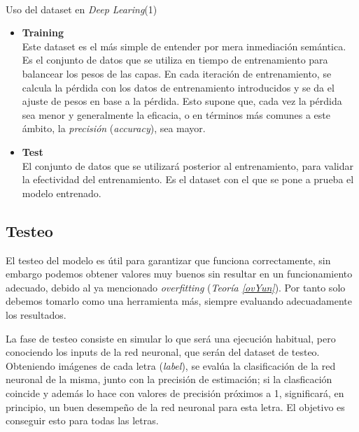 \begin{teoria}{Uso del dataset en \textit{Deep Learing}(1)\textsuperscript{\cite{Andreas}}}
\begin{itemize}
\begin{teoria}{\textit{Overfitting} y \textit{Underfitting}\label{ovYun}}
\begin{itemize}
                \item \textbf{\textit{Underfitting}}\\
                {\small Término análogo y opuesto al anterior, el ajuste se
                presentaría laxo y falto de rigurosidad; ajuste por debajo de
                lo óptimo.} 
            \end{itemize}\end{teoria}
        \item \textbf{Training}\\
        {\small Este dataset es el más simple de entender por mera inmediación
        semántica. Es el conjunto de datos que se utiliza en tiempo de entrenamiento
        para balancear los pesos de las capas. En cada iteración de entrenamiento,
        se calcula la pérdida con los datos de entrenamiento introducidos y
        se da el ajuste de pesos en base a la pérdida. Esto supone que, cada vez la
        pérdida sea menor y generalmente la eficacia, o en términos más comunes a este
        ámbito, la \textit{precisión} (\textit{accuracy}), sea mayor.}
        \item \textbf{Test}\\
        {\small El conjunto de datos que se utilizará posterior al entrenamiento, para
        validar la efectividad del entrenamiento.
        Es el dataset con el que se pone a prueba el modelo entrenado.}
    \end{itemize}
\end{teoria}
\newpage

\subsection{Testeo}
El testeo del modelo es útil para garantizar que funciona correctamente, sin
embargo podemos obtener valores muy buenos sin resultar en un funcionamiento
adecuado, debido al ya mencionado \textit{overfitting} (\textit{Teoría \ref{ovYun}}).
Por tanto solo debemos tomarlo como una herramienta más, siempre evaluando
adecuadamente los resultados.

La fase de testeo consiste en simular lo que será una ejecución habitual,
pero conociendo los inputs de la red neuronal, que serán del dataset
de testeo. Obteniendo imágenes de cada letra (\textit{label}), se evalúa
la clasificación de la red neuronal de la misma, junto con la precisión
de estimación; si la clasficación coincide y además lo hace con valores de
precisión próximos a 1, significará, en principio, un buen desempeño de la red
neuronal para
esta letra. El objetivo es conseguir esto para todas las letras.

